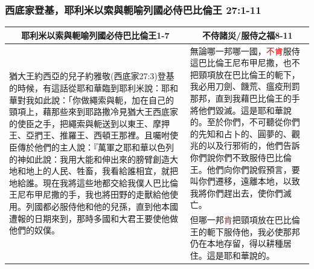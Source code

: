 \subsubsection{西底家登基，耶利米以索與軛喻列國必侍巴比倫王 27:1-11}
\begin{table}[H]
\centering
\begin{tabular}{p{9cm}|p{7.50cm}}\hline\hline
\multicolumn{1}{c|}{耶利米以索與軛喻列國必侍巴比倫王1-7}&\multicolumn{1}{c}{不侍諸災/服侍之福8-11}\\\hline
\multirow{2}{9.2cm}{猶大王約西亞的兒子約雅敬(西底家27:3)登基的時候，有這話從耶和華臨到耶利米說：耶和華對我如此說：「你做繩索與軛，加在自己的頸項上，藉那些來到耶路撒冷見猶大王西底家的使臣之手，把繩索與軛送到以東王、摩押王、亞捫王、推羅王、西頓王那裡。且囑咐使臣傳於他們的主人說：『萬軍之耶和華以色列的神如此說：我用大能和伸出來的膀臂創造大地和地上的人民、牲畜，我看給誰相宜，就把地給誰。現在我將這些地都交給我僕人巴比倫王尼布甲尼撒的手，我也將田野的走獸給他使用。列國都必服侍他和他的兒孫，直到他本國遭報的日期來到，那時多國和大君王要使他做他們的奴僕。}
&無論哪一邦哪一國，\textcolor{red}{不肯}服侍這巴比倫王尼布甲尼撒，也不把頸項放在巴比倫王的軛下，我必用刀劍、饑荒、瘟疫刑罰那邦，直到我藉巴比倫王的手將他們毀滅。這是耶和華說的。至於你們，不可聽從你們的先知和占卜的、圓夢的、觀兆的以及行邪術的，他們告訴你們說你們不致服侍巴比倫王。他們向你們說假預言，要叫你們遷移，遠離本地，以致我將你們趕出去，使你們滅亡。\\\cline{2-2}
&但哪一邦\textcolor{red}{肯}把頸項放在巴比倫王的軛下服侍他，我必使那邦仍在本地存留，得以耕種居住。這是耶和華說的。\\\hline
\end{tabular}
\end{table}

